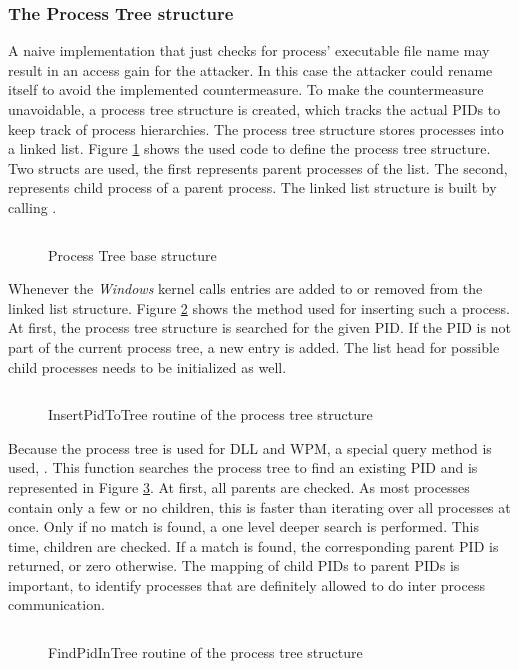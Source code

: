 \subsubsection{The Process Tree structure}
A naive implementation that just checks for process' executable file name may result in an access gain for the attacker. In this case the attacker could rename itself to avoid the implemented countermeasure. To make the countermeasure unavoidable, a process tree structure is created, which tracks the actual \glspl{PID} to keep track of process hierarchies. The process tree structure stores processes into a linked list. Figure \ref{code:code1} shows the used code to define the process tree structure. Two structs are used, the first  represents parent processes of the list. The second,  represents child process of a parent process. The linked list structure is built by calling  \cite{msdn_initlisthead}.
\begin{figure}[tbph]
\inputminted[breakanywhere, breaklines,fontsize=\scriptsize, frame=single, mathescape, linenos, numbersep=5pt, numbersep=5pt, xleftmargin=0pt]{c}{sections/implementation/code1.c}
\caption{Process Tree base structure}
\label{code:code1}
\end{figure}
Whenever the \emph{Windows} kernel calls  entries are added to or removed from the linked list structure. Figure \ref{code:code2} shows the method used for inserting such a process. At first, the process tree structure is searched for the given \gls{PID}. If the \gls{PID} is not part of the current process tree, a new entry is added. The list head for possible child processes needs to be initialized as well.
\begin{figure}[tbph]
\inputminted[breakanywhere, breaklines,fontsize=\scriptsize, frame=single, mathescape, linenos, numbersep=5pt, numbersep=5pt, xleftmargin=0pt]{c}{sections/implementation/code2.c}
\caption{InsertPidToTree routine of the process tree structure}
\label{code:code2}
\end{figure}
Because the process tree is used for \gls{DLL} and \gls{WPM}, a special query method is used, . This function searches the process tree to find an existing \gls{PID} and is represented in Figure \ref{code:code3}. At first, all parents are checked. As most processes contain only a few or no children, this is faster than iterating over all processes at once. Only if no match is found, a one level deeper search is performed. This time, children are checked. If a match is found, the corresponding parent \gls{PID} is returned, or zero otherwise. The mapping of child \glspl{PID} to parent \glspl{PID} is important, to identify processes that are definitely allowed to do inter process communication.
\begin{figure}[tbph]
\inputminted[breakanywhere, breaklines,fontsize=\scriptsize, frame=single, mathescape, linenos, numbersep=5pt, numbersep=5pt, xleftmargin=0pt]{c}{sections/implementation/code3.c}
\caption{FindPidInTree routine of the process tree structure}
\label{code:code3}
\end{figure}

